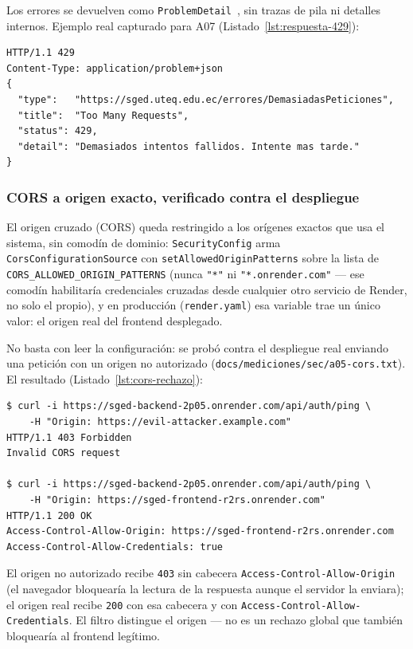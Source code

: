 \documentclass[11pt,a4paper]{article}
\newcommand{\ruta}[1]{\texttt{\footnotesize #1}}
\begin{document}
Los errores se devuelven como \texttt{ProblemDetail}~\cite{rfc9457}, sin
trazas de pila ni detalles internos. Ejemplo real capturado para A07
(Listado~\ref{lst:respuesta-429}):

\begin{lstlisting}[caption={Respuesta al sexto intento de autenticación},label={lst:respuesta-429}]
HTTP/1.1 429
Content-Type: application/problem+json
{
  "type":   "https://sged.uteq.edu.ec/errores/DemasiadasPeticiones",
  "title":  "Too Many Requests",
  "status": 429,
  "detail": "Demasiados intentos fallidos. Intente mas tarde."
}
\end{lstlisting}

\subsubsection{CORS a origen exacto, verificado contra el despliegue}
\label{sec:cors}

El origen cruzado (CORS) queda restringido a los orígenes exactos que
usa el sistema, sin comodín de dominio: \texttt{SecurityConfig} arma
\texttt{CorsConfigurationSource} con \texttt{setAllowedOriginPatterns}
sobre la lista de \texttt{CORS\_ALLOWED\_ORIGIN\_PATTERNS} (nunca
\texttt{"*"} ni \texttt{"*.onrender.com"} — ese comodín habilitaría
credenciales cruzadas desde cualquier otro servicio de Render, no solo
el propio), y en producción (\texttt{render.yaml}) esa variable trae un
único valor: el origen real del frontend desplegado.

No basta con leer la configuración: se probó contra el despliegue real
enviando una petición con un origen no autorizado
(\ruta{docs/mediciones/sec/a05-cors.txt}). El resultado (Listado~\ref{lst:cors-rechazo}):

\begin{lstlisting}[caption={CORS contra un origen no autorizado, despliegue real},label={lst:cors-rechazo}]
$ curl -i https://sged-backend-2p05.onrender.com/api/auth/ping \
    -H "Origin: https://evil-attacker.example.com"
HTTP/1.1 403 Forbidden
Invalid CORS request

$ curl -i https://sged-backend-2p05.onrender.com/api/auth/ping \
    -H "Origin: https://sged-frontend-r2rs.onrender.com"
HTTP/1.1 200 OK
Access-Control-Allow-Origin: https://sged-frontend-r2rs.onrender.com
Access-Control-Allow-Credentials: true
\end{lstlisting}

El origen no autorizado recibe \texttt{403} sin cabecera
\texttt{Access-Control-Allow-Origin} (el navegador bloquearía la
lectura de la respuesta aunque el servidor la enviara); el origen real
recibe \texttt{200} con esa cabecera y con
\texttt{Access-Control-Allow-Credentials}. El filtro distingue el
origen — no es un rechazo global que también bloquearía al frontend
legítimo.
\end{document}
